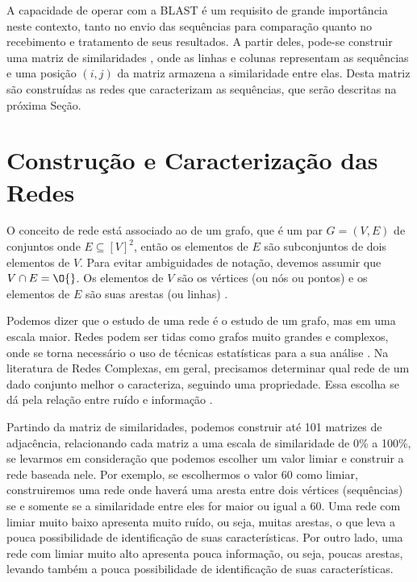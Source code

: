 
A capacidade de operar com a BLAST é um requisito de grande importância neste contexto, tanto no envio das sequências para comparação quanto no recebimento
e tratamento de seus resultados. A partir deles, pode-se construir uma matriz de similaridades \cite{andrade2011}, onde as linhas e colunas representam as
sequências e uma posição $(i, j)$ da matriz armazena a similaridade entre elas. Desta matriz são construídas as redes que caracterizam as sequências, que
serão descritas na próxima Seção.

\section{Construção e Caracterização das Redes} \label{sec:conscarac}

O conceito de rede está associado ao de um grafo, que é um par $G = (V, E)$ de conjuntos onde $E \subseteq [V]^2$, então os elementos de $E$
são subconjuntos de dois elementos de $V$. Para evitar ambiguidades de notação, devemos assumir que $V \cap E = \O{}$. Os elementos de $V$ são os vértices
(ou nós ou pontos) e os elementos de $E$ são suas arestas (ou linhas) \cite{reinhard2010}.

Podemos dizer que o estudo de uma rede é o estudo de um grafo, mas em uma escala maior. Redes podem ser tidas como grafos muito grandes e complexos,
onde se torna necessário o uso de técnicas estatísticas para a sua análise \cite{bessa2008}. Na literatura de Redes Complexas, em geral, precisamos
determinar qual rede de um dado conjunto melhor o caracteriza, seguindo uma propriedade. Essa escolha se dá pela relação entre ruído e informação
\cite{barabasi2004}.

Partindo da matriz de similaridades, podemos construir até 101 matrizes de adjacência, relacionando cada matriz a uma escala de similaridade
de 0\% a 100\%, se levarmos
em consideração que podemos escolher um valor limiar e construir a rede baseada nele. Por exemplo, se escolhermos o valor 60 como limiar, construiremos uma
rede onde haverá uma aresta entre dois vértices (sequências) se e somente se a similaridade entre eles for maior ou igual a 60. Uma rede com limiar
muito baixo apresenta muito ruído, ou seja, muitas arestas, o que leva a pouca possibilidade de identificação de suas características. Por outro lado, uma
rede com limiar muito alto apresenta pouca informação, ou seja, poucas arestas, levando também a pouca possibilidade de identificação de suas características.

